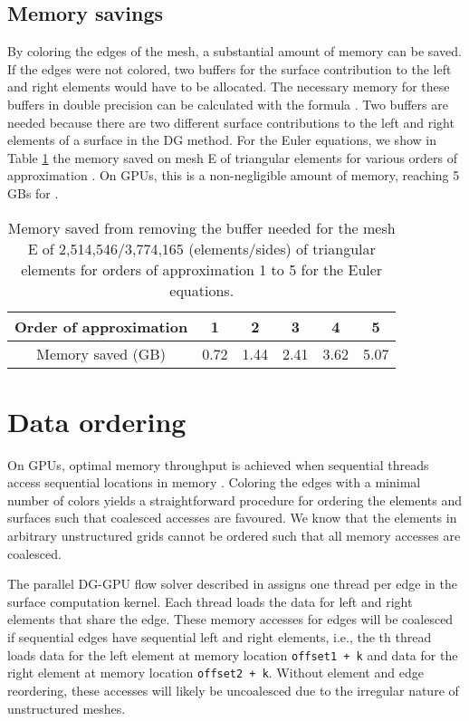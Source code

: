 \documentclass[12pt]{article}
\begin{document}
\subsection{Memory savings} \label{sec:memorysaved}
	By coloring the edges of the mesh, a substantial amount of memory can be saved.  If the edges were not colored, two buffers for the surface contribution to the left and right elements would have to be allocated.  The necessary memory for these buffers in double precision can be calculated with the formula .  Two buffers are needed because there are two different surface contributions to the left and right elements of a surface in the DG method.  For the Euler equations, we show in Table \ref{tab:memory} the memory saved on mesh E of triangular elements for various orders of approximation .  On GPUs, this is a non-negligible amount of memory, reaching 5 GBs for .
	
		\begin{table}
		\centering

		\begin{tabular}{|c|c|c|c|c|c|}
				\hline Order of approximation  & 1 & 2 & 3 & 4 & 5 \\ 
				\hline Memory saved (GB) & 0.72 & 1.44 & 2.41 & 3.62 & 5.07  \\
				\hline
		\end{tabular} 
		\caption{Memory saved from removing the buffer needed for the mesh E of 2,514,546/3,774,165 (elements/sides) of triangular elements for orders of approximation 1 to 5 for the Euler equations.} \label{tab:memory}
		\end{table}



\section{Data ordering}

On GPUs, optimal memory throughput is achieved when sequential threads access sequential locations in memory \cite{programmingguide}.  Coloring the edges with a minimal number of colors yields a straightforward procedure for ordering the elements and surfaces such that coalesced accesses are favoured.  We know that the elements in arbitrary unstructured grids cannot be ordered such that all memory accesses are coalesced.


The parallel DG-GPU flow solver described in \cite{giuliani} assigns one thread per edge in the surface computation kernel.  Each thread loads the data for left and right elements that share the edge.  These memory accesses for edges will be coalesced if sequential edges have sequential left and right elements, i.e., the th thread loads data for the left element at memory location \texttt{offset1 + k} and data for the right element at memory location \texttt{offset2 + k}.  Without element and edge reordering, these accesses will likely be uncoalesced due to the irregular nature of unstructured meshes.
\end{document}
